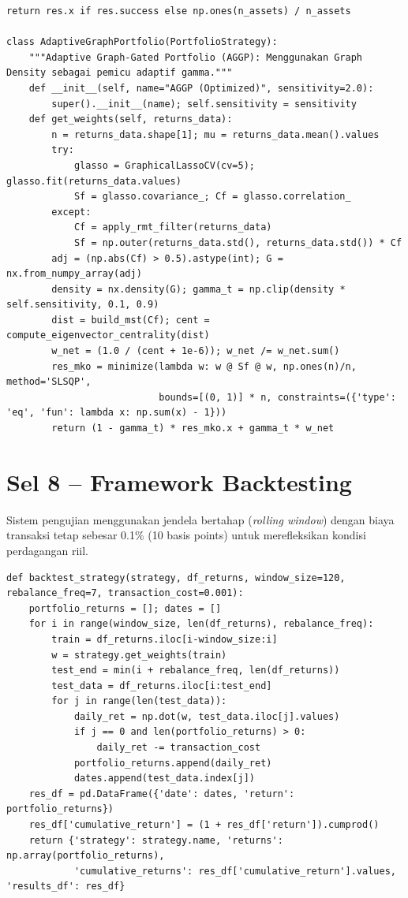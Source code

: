 \documentclass[12pt,a4paper]{article}
\begin{document}
\begin{lstlisting}[caption={Kelas-kelas strategi portofolio}]
        return res.x if res.success else np.ones(n_assets) / n_assets

class AdaptiveGraphPortfolio(PortfolioStrategy):
    """Adaptive Graph-Gated Portfolio (AGGP): Menggunakan Graph Density sebagai pemicu adaptif gamma."""
    def __init__(self, name="AGGP (Optimized)", sensitivity=2.0):
        super().__init__(name); self.sensitivity = sensitivity
    def get_weights(self, returns_data):
        n = returns_data.shape[1]; mu = returns_data.mean().values
        try:
            glasso = GraphicalLassoCV(cv=5); glasso.fit(returns_data.values)
            Sf = glasso.covariance_; Cf = glasso.correlation_
        except:
            Cf = apply_rmt_filter(returns_data)
            Sf = np.outer(returns_data.std(), returns_data.std()) * Cf
        adj = (np.abs(Cf) > 0.5).astype(int); G = nx.from_numpy_array(adj)
        density = nx.density(G); gamma_t = np.clip(density * self.sensitivity, 0.1, 0.9)
        dist = build_mst(Cf); cent = compute_eigenvector_centrality(dist)
        w_net = (1.0 / (cent + 1e-6)); w_net /= w_net.sum()
        res_mko = minimize(lambda w: w @ Sf @ w, np.ones(n)/n, method='SLSQP', 
                           bounds=[(0, 1)] * n, constraints=({'type': 'eq', 'fun': lambda x: np.sum(x) - 1}))
        return (1 - gamma_t) * res_mko.x + gamma_t * w_net
\end{lstlisting}

\section{Sel 8 -- Framework Backtesting}
Sistem pengujian menggunakan jendela bertahap (\textit{rolling window}) dengan biaya transaksi tetap sebesar 0.1\% (10 basis points) untuk merefleksikan kondisi perdagangan riil.

\begin{lstlisting}[caption={Fungsi simulasi backtest}]
def backtest_strategy(strategy, df_returns, window_size=120, rebalance_freq=7, transaction_cost=0.001):
    portfolio_returns = []; dates = []
    for i in range(window_size, len(df_returns), rebalance_freq):
        train = df_returns.iloc[i-window_size:i]
        w = strategy.get_weights(train)
        test_end = min(i + rebalance_freq, len(df_returns))
        test_data = df_returns.iloc[i:test_end]
        for j in range(len(test_data)):
            daily_ret = np.dot(w, test_data.iloc[j].values)
            if j == 0 and len(portfolio_returns) > 0:
                daily_ret -= transaction_cost
            portfolio_returns.append(daily_ret)
            dates.append(test_data.index[j])
    res_df = pd.DataFrame({'date': dates, 'return': portfolio_returns})
    res_df['cumulative_return'] = (1 + res_df['return']).cumprod()
    return {'strategy': strategy.name, 'returns': np.array(portfolio_returns),
            'cumulative_returns': res_df['cumulative_return'].values, 'results_df': res_df}
\end{lstlisting}
\end{document}

